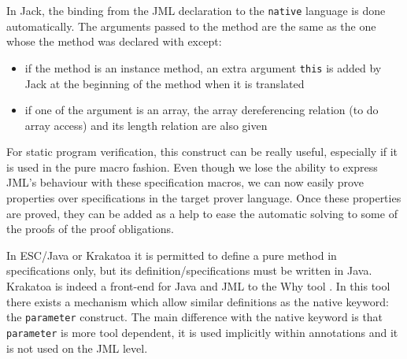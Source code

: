 In Jack, the binding from the JML declaration to the {\tt native} language is done automatically.
The arguments passed to the method are the same as the one whose the method was declared with
except:
\begin{itemize}
\item if the method is an instance method, an extra argument {\tt this} is added by Jack 
  at the beginning of the method when it is translated
\item if one of the argument is an array, the array dereferencing relation
(to do array access) and its length relation are also given
\end{itemize}


For static program verification, this construct can be really useful, especially if 
it is used in the pure macro fashion. 
Even though we lose the ability to express JML's behaviour
with these specification macros, 
we can now easily prove properties over specifications in the target prover language. 
Once these properties are proved, they can be added as a help
to ease the automatic solving to some of the proofs of the proof obligations.

In  ESC/Java or Krakatoa it is permitted to define a pure method in
specifications only, but its definition/specifications must be written in Java.
Krakatoa is indeed a front-end for Java and JML to the Why tool \cite{Why-Tool}. 
In this tool there exists a mechanism 
which allow similar definitions as the native keyword: the {\tt parameter} construct.
The main difference with the native keyword is that {\tt parameter} is more tool dependent, 
 it is used implicitly within annotations and it is not used on the JML level.


